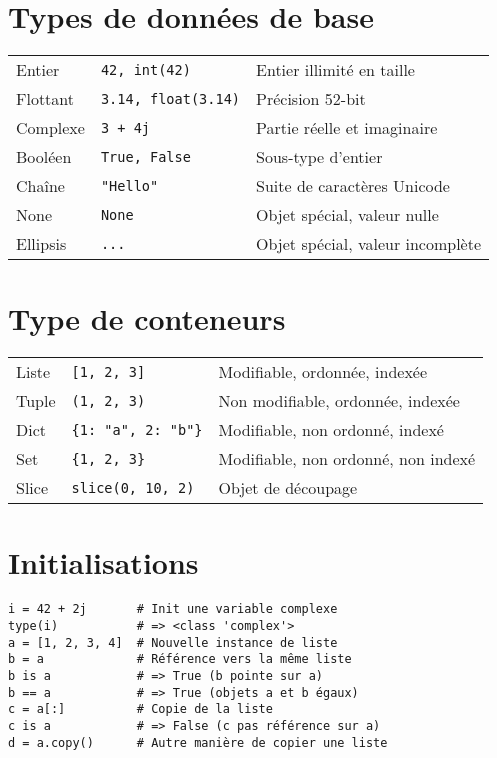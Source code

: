 \documentclass[9pt]{extarticle}
\begin{document}
\begin{multicols*}{4}
\section*{Types de données de base}

\begin{tabularx}{\columnwidth}{llX}
    Entier & \texttt{42, int(42)} & Entier illimité en taille \\
    Flottant & \texttt{3.14, float(3.14)} & Précision 52-bit \\
    Complexe & \texttt{3 + 4j} & Partie réelle et imaginaire \\
    Booléen & \texttt{True, False} & Sous-type d'entier \\
    Chaîne & \texttt{"Hello"} & Suite de caractères Unicode \\
    None & \texttt{None} & Objet spécial, valeur nulle \\
    Ellipsis & \texttt{...} & Objet spécial, valeur incomplète \\
\end{tabularx}

\section*{Type de conteneurs}

\begin{tabularx}{\columnwidth}{llX}
Liste & \texttt{[1, 2, 3]} & Modifiable, ordonnée, indexée \\
Tuple & \texttt{(1, 2, 3)} & Non modifiable, ordonnée, indexée \\
Dict & \texttt{\{1: "a", 2: "b"\}} & Modifiable, non ordonné, indexé \\
Set & \texttt{\{1, 2, 3\}} & Modifiable, non ordonné, non indexé \\
Slice & \texttt{slice(0, 10, 2)} & Objet de découpage \\
\end{tabularx}

\section*{Initialisations}

\begin{lstlisting}
i = 42 + 2j       # Init une variable complexe
type(i)           # => <class 'complex'>
a = [1, 2, 3, 4]  # Nouvelle instance de liste
b = a             # Référence vers la même liste
b is a            # => True (b pointe sur a)
b == a            # => True (objets a et b égaux)
c = a[:]          # Copie de la liste
c is a            # => False (c pas référence sur a)
d = a.copy()      # Autre manière de copier une liste
\end{lstlisting}


\end{multicols*}
\end{document}

